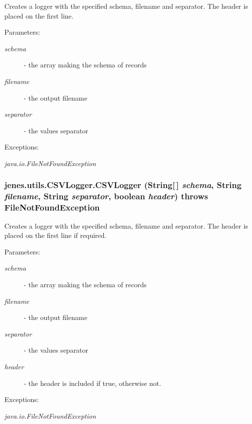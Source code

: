 Creates a logger with the specified schema, filename and separator. The header is placed on the first line.

\begin{Desc}
\item[Parameters:]
\begin{description}
\item[{\em schema}]- the array making the schema of records \item[{\em filename}]- the output filename \item[{\em separator}]- the values separator \end{description}
\end{Desc}
\begin{Desc}
\item[Exceptions:]
\begin{description}
\item[{\em java.io.FileNotFoundException}]\end{description}
\end{Desc}
\hypertarget{classjenes_1_1utils_1_1_c_s_v_logger_d39241223c9d49bfa34a21db4aa1f8b1}{
\subsubsection[CSVLogger]{\setlength{\rightskip}{0pt plus 5cm}jenes.utils.CSVLogger.CSVLogger (String\mbox{[}$\,$\mbox{]} {\em schema}, \/  String {\em filename}, \/  String {\em separator}, \/  boolean {\em header})  throws FileNotFoundException }}
\label{classjenes_1_1utils_1_1_c_s_v_logger_d39241223c9d49bfa34a21db4aa1f8b1}


Creates a logger with the specified schema, filename and separator. The header is placed on the first line if required.

\begin{Desc}
\item[Parameters:]
\begin{description}
\item[{\em schema}]- the array making the schema of records \item[{\em filename}]- the output filename \item[{\em separator}]- the values separator \item[{\em header}]- the header is included if true, otherwise not. \end{description}
\end{Desc}
\begin{Desc}
\item[Exceptions:]
\begin{description}
\item[{\em java.io.FileNotFoundException}]\end{description}
\end{Desc}


